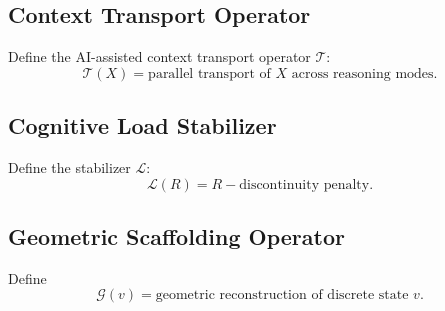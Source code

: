 \documentclass[12pt]{article}
\begin{document}
\subsection{Context Transport Operator}
Define the AI-assisted context transport operator $\mathcal{T}$:
\[
\mathcal{T}(X) = \text{parallel transport of } X \text{ across reasoning modes}.
\]

\subsection{Cognitive Load Stabilizer}
Define the stabilizer $\mathcal{L}$:
\[
\mathcal{L}(R) = R - \text{discontinuity penalty}.
\]

\subsection{Geometric Scaffolding Operator}
Define
\[
\mathcal{G}(v) = \text{geometric reconstruction of discrete state } v.
\]


%
%
\end{document}
